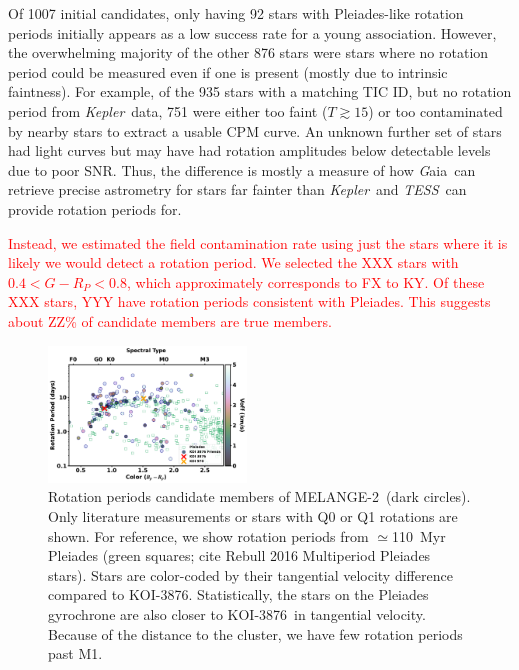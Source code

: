 \documentclass[twocolumn]{aastex631}
\newcommand{\starname}{KOI-3876}
\newcommand{\kepler}{{\it Kepler}}
\newcommand{\tess}{\textit{TESS}}
\newcommand{\gaia}{{\textit Gaia}}
\newcommand{\association}{MELANGE-2}
\begin{document}
Of 1007 initial candidates, only having 92 stars with Pleiades-like rotation periods initially appears as a low success rate for a young association. However, the overwhelming majority of the other 876 stars were stars where no rotation period could be measured even if one is present (mostly due to intrinsic faintness). For example, of the 935 stars with a matching TIC ID, but no rotation period from \kepler\ data, 751 were either too faint ($T\gtrsim15$) or too contaminated by nearby stars to extract a usable CPM curve. An unknown further set of stars had light curves but may have had rotation amplitudes below detectable levels due to poor SNR. Thus, the difference is mostly a measure of how \gaia\ can retrieve precise astrometry for stars far fainter than \kepler\ and \tess\ can provide rotation periods for. 

\textcolor{red}{Instead, we estimated the field contamination rate using just the stars where it is likely we would detect a rotation period. We selected the XXX stars with $0.4<G-R_P<0.8$, which approximately corresponds to FX to KY. Of these XXX stars, YYY have rotation periods consistent with Pleiades. This suggests about ZZ\% of candidate members are true members. }




\begin{figure}[tbh]
    \centering
    \includegraphics[width=0.47\textwidth, scale = 1.1]{koi3876_cp-seq_final2.pdf}
    \caption{Rotation periods candidate members of \association\ (dark circles). Only literature measurements or stars with Q0 or Q1 rotations are shown. For reference, we show rotation periods from $\simeq$110\, Myr Pleiades (green squares; cite Rebull 2016 Multiperiod Pleiades stars). Stars are color-coded by their tangential velocity difference compared to \starname. Statistically, the stars on the Pleiades gyrochrone are also closer to \starname\ in tangential velocity. Because of the distance to the cluster, we have few rotation periods past M1. 
    \label{fig:rotation}
    }
\end{figure} 
\end{document}
